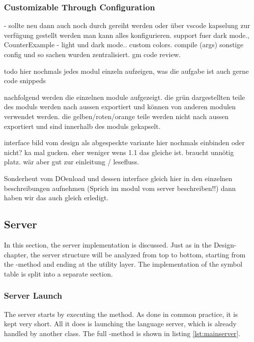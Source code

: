 \subsubsection{Customizable Through Configuration}
  - sollte neu dann auch noch durch gereiht werden oder über vscode kapselung zur verfügung gestellt werden
man kann alles konfigurieren. support fuer dark mode.,
CounterExample  - light und dark mode.. custom colors.
compile (args)
sonstige config und so sachen wurden zentralisiert. gm code review.



todo hier nochmals jedes modul einzeln aufzeigen, was die aufgabe ist
auch gerne code snippeds

nachfolgend werden die einzelnen module aufgezeigt.
die grün dargestellten teile des moduls werden nach aussen exportiert und können von anderen modulen verwendet werden.
die gelben/roten/orange teile werden nicht nach aussen exportiert und sind innerhalb des moduls gekapselt.

interface bild vom design als abgespeckte variante hier nochmals einbinden oder nicht? ka mal gucken. eher weniger wens 1.1 das gleiche ist. braucht unnötig platz. wär aber gut zur einleitung / lesefluss.

Sonderheut vom DOenload und dessen interface gleich hier in den einzelnen beschreibungen aufnehmen (Sprich im modul vom server beschreiben!!) dann haben wir das auch gleich erledigt.



\subsection{Server}
In this section, the server implementation is discussed.
Just as in the Design-chapter, the server structure will be analyzed from top to bottom, starting from the -method and ending at the utility layer.
The implementation of the symbol table is split into a separate section.

\subsubsection{Server Launch}
The server starts by executing the  method.
As done in common practice, it is kept very short.
All it does is launching the language server, which is already handled by another class.
The full -method is shown in listing \ref{lst:mainserver}.

